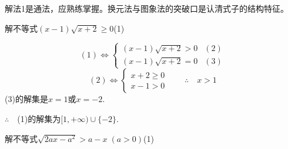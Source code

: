 \begin{solution}
\begin{figure}[htp]
    \caption{}
\end{figure}

\end{solution}

\begin{rmk}
解法1是通法，应熟练掌握。换元法与图象法的突破口是认清式子的结构特征。
\end{rmk}

\begin{example}
解不等式$(x-1)\sqrt{x+2}\ge 0$\hfill (1)
\end{example}

\begin{solution}
\[(1)\Longleftrightarrow \begin{cases}
    (x-1)\sqrt{x+2}>0& (2)\\
    (x-1)\sqrt{x+2}=0 & (3)
\end{cases}\]
\[(2)\Longleftrightarrow \begin{cases}
    x+2\ge 0\\ x-1>0 
\end{cases}\qquad \therefore\quad x>1\]
(3)的解集是$x=1$或$x=-2$.

$\therefore\quad $(1)的解集为$[1,+\infty)\cup\{-2\}$.
\end{solution}

\begin{example}
解不等式$\sqrt{2ax-a^2}>a-x\; (a>0)$\hfill (1)
\end{example}

